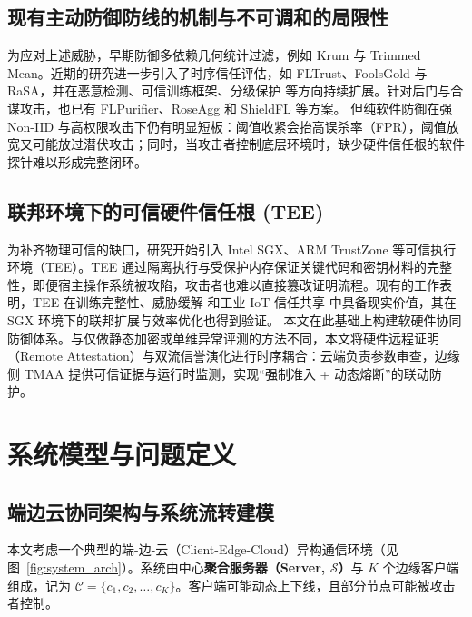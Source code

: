 \documentclass[11pt, a4paper, UTF8, fontset=fandol]{ctexart}
\begin{document}
\subsection{现有主动防御防线的机制与不可调和的局限性}
为应对上述威胁，早期防御多依赖几何统计过滤，例如 Krum\cite{blanchard2017krum} 与 Trimmed Mean\cite{yin2018byzantine}。近期的研究进一步引入了时序信任评估，如 FLTrust\cite{cao2021fltrust}、FoolsGold\cite{fung2020foolsgold} 与 RaSA\cite{wang2025rasa}，并在恶意检测\cite{dou2025toward}、可信训练框架\cite{lu2025tmt}、分级保护\cite{wang2024federated} 等方向持续扩展。针对后门与合谋攻击，也已有 FLPurifier\cite{flpurifier}、RoseAgg\cite{roseagg} 和 ShieldFL\cite{shieldfl} 等方案。
但纯软件防御在强 Non-IID 与高权限攻击下仍有明显短板：阈值收紧会抬高误杀率（FPR），阈值放宽又可能放过潜伏攻击；同时，当攻击者控制底层环境时，缺少硬件信任根的软件探针难以形成完整闭环。

\subsection{联邦环境下的可信硬件信任根 (TEE)}
为补齐物理可信的缺口，研究开始引入 Intel SGX、ARM TrustZone 等可信执行环境（TEE）。TEE 通过隔离执行与受保护内存保证关键代码和密钥材料的完整性，即便宿主操作系统被攻陷，攻击者也难以直接篡改证明流程\cite{liao2024verifiable,zhang2025rppfl}。现有的工作表明，TEE 在训练完整性\cite{r1_tee_integrity}、威胁缓解\cite{r5_tee_mitigating} 和工业 IoT 信任共享\cite{r12_iot_tee} 中具备现实价值，其在 SGX 环境下的联邦扩展与效率优化也得到验证\cite{xu2021distributed,yan2024efficient}。
本文在此基础上构建软硬件协同防御体系。与仅做静态加密或单维异常评测的方法不同，本文将硬件远程证明（Remote Attestation）与双流信誉演化进行时序耦合：云端负责参数审查，边缘侧 TMAA 提供可信证据与运行时监测，实现“强制准入 + 动态熔断”的联动防护。


\section{系统模型与问题定义}

\subsection{端边云协同架构与系统流转建模}
本文考虑一个典型的端-边-云（Client-Edge-Cloud）异构通信环境（见图~\ref{fig:system_arch}）。系统由中心\textbf{聚合服务器（Server, $\mathcal{S}$）}与 $K$ 个边缘客户端组成，记为 $\mathcal{C}=\{c_1, c_2, \dots, c_K\}$。客户端可能动态上下线，且部分节点可能被攻击者控制。
\end{document}
